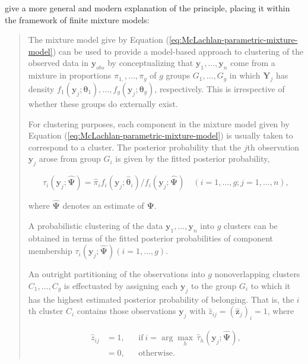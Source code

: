 \documentclass[english]{article}
\begin{document}
\cite{McLachlan2019} give a more general and modern explanation of
the principle, placing it within the framework of finite mixture models:
\begin{quote}
The mixture model give by Equation (\ref{eq:McLachlan-parametric-mixture-model})
can be used to provide a model-based approach to clustering of the
observed data in $\boldsymbol{y}_{obs}$ by conceptualizing that $\boldsymbol{y}_{1},\ldots,\boldsymbol{y}_{n}$
come from a mixture in proportions $\pi_{1,},\ldots,\pi_{g}$ of $g$
groups $G_{1},\ldots,G_{g}$ in which $\boldsymbol{Y}_{j}$ has density
$f_{1}(\boldsymbol{y}_{j};\mathbf{\boldsymbol{\theta}}_{1}),\ldots,f_{g}(\boldsymbol{y}_{j};\boldsymbol{\theta}_{g})$,
respectively. This is irrespective of whether these groups do externally
exist.

For clustering purposes, each component in the mixture model given
by Equation (\ref{eq:McLachlan-parametric-mixture-model}) is usually
taken to correspond to a cluster. The posterior probability that the
$j$th observation $\boldsymbol{y}_{j}$ arose from group $G_{i}$
is given by the fitted posterior probability,

\begin{equation}
\tau_{i}(\boldsymbol{y}_{j};\hat{\boldsymbol{\Psi}})=\hat{\pi}_{i}f_{i}(\boldsymbol{y}_{j};\hat{\boldsymbol{\theta}}_{i})/f_{i}(\boldsymbol{y}_{j};\hat{\boldsymbol{\Psi}})\quad(i=1,\ldots,g;j=1,\ldots,n),\label{eq:discriminant-analysis-McLachlan2019-tau}
\end{equation}

where $\hat{\boldsymbol{\Psi}}$ denotes an estimate of $\boldsymbol{\Psi}$.

A probabilistic clustering of the data $\boldsymbol{y}_{1},\ldots,\boldsymbol{y}_{n}$
into $g$ clusters can be obtained in terms of the fitted posterior
probabilities of component membership $\tau_{i}(\boldsymbol{y}_{j};\hat{\boldsymbol{\Psi}})(i=1,\dots,g)$.

An outright partitioning of the observations into $g$ nonoverlapping
clusters $C_{1},\dots,C_{g}$ is effectuated by assigning each $\boldsymbol{y}_{j}$
to the group $G_{i}$ to which it has the highest estimated posterior
probability of belonging. That is, the $i$th cluster $C_{i}$ contains
those observations $\boldsymbol{y}_{j}$ with $\hat{z}_{ij}=\left(\hat{\mathbf{z}}_{j}\right)_{i}=1$,
where 

\begin{equation}
\begin{array}{cccc}
\hat{z}_{ij} & =1, &  & \mathrm{if}\:i=\arg\underset{h}{\max}\,\hat{\tau}_{h}(\boldsymbol{y}_{j};\hat{\boldsymbol{\Psi}}),\\
 & =0, &  & \mathrm{otherwise.\qquad\qquad\qquad}
\end{array}\label{eq:discriminant-analysis-McLachlan2019-Bayes-rule}
\end{equation}


\end{quote}
\end{document}
